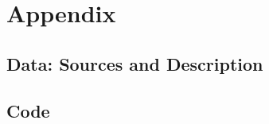 \documentclass[a4paper,12pt,oneside,pointednumbers,bibtotoc,bigheadings,liststotoc]{scrbook}
\begin{document}
\chapter{Appendix}
\label{DataAndCode}
\section{Data: Sources and Description}
\label{sec:data}

\section{Code}
\label{sec:rcode}

\end{document}
